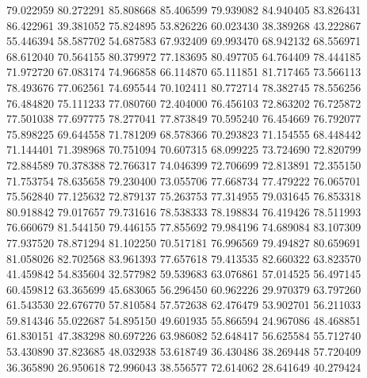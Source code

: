 79.022959
80.272291
85.808668
85.406599
79.939082
84.940405
83.826431
86.422961
39.381052
75.824895
53.826226
60.023430
38.389268
43.222867
55.446394
58.587702
54.687583
67.932409
69.993470
68.942132
68.556971
68.612040
70.564155
80.379972
77.183695
80.497705
64.764409
78.444185
71.972720
67.083174
74.966858
66.114870
65.111851
81.717465
73.566113
78.493676
77.062561
74.695544
70.102411
80.772714
78.382745
78.556256
76.484820
75.111233
77.080760
72.404000
76.456103
72.863202
76.725872
77.501038
77.697775
78.277041
77.873849
70.595240
76.454669
76.792077
75.898225
69.644558
71.781209
68.578366
70.293823
71.154555
68.448442
71.144401
71.398968
70.751094
70.607315
68.099225
73.724690
72.820799
72.884589
70.378388
72.766317
74.046399
72.706699
72.813891
72.355150
71.753754
78.635658
79.230400
73.055706
77.668734
77.479222
76.065701
75.562840
77.125632
72.879137
75.263753
77.314955
79.031645
76.853318
80.918842
79.017657
79.731616
78.538333
78.198834
76.419426
78.511993
76.660679
81.544150
79.446155
77.855692
79.984196
74.689084
83.107309
77.937520
78.871294
81.102250
70.517181
76.996569
79.494827
80.659691
81.058026
82.702568
83.961393
77.657618
79.413535
82.660322
63.823570
41.459842
54.835604
32.577982
59.539683
63.076861
57.014525
56.497145
60.459812
63.365699
45.683065
56.296450
60.962226
29.970379
63.797260
61.543530
22.676770
57.810584
57.572638
62.476479
53.902701
56.211033
59.814346
55.022687
54.895150
49.601935
55.866594
24.967086
48.468851
61.830151
47.383298
80.697226
63.986082
52.648417
56.625584
55.712740
53.430890
37.823685
48.032938
53.618749
36.430486
38.269448
57.720409
36.365890
26.950618
72.996043
38.556577
72.614062
28.641649
40.279424
